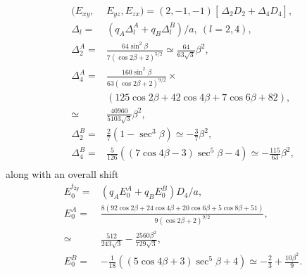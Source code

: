 \documentclass[a4paper,prb]{revtex4-1}  %
\newcommand{\rev}[1]{{\color{blue}{#1}}}
\begin{document}
\begin{align}
(E_{xy},&E_{yz},E_{zx})= (2, -1, -1)
\left[\frac{}{} \Delta_{2}  D_2 + \Delta_4 D_4\right],\\
\Delta_{l} =&  \left(q_A \Delta_{l}^A + q_B\Delta_{l}^B\right)/a,~(l=2,4),\\
\Delta_{2}^A =& 
\frac{64 \sin ^2\beta }{7 (\cos 2 \beta +2)^{5/2}} %
 \simeq \frac{64}{63 \sqrt{3}}\beta ^2,\\
\Delta_4^A =&
 \frac{160 \sin ^2\beta}{63 (\cos 2\beta+2)^{9/2}} \times \\
&  (125 \cos 2\beta+42 \cos 4\beta+7 \cos 6\beta+82),\\
\simeq& \frac{40960}{5103 \sqrt{3}}\beta ^2,\\
\Delta_{2}^B =& \frac{2}{7} \left(1-\sec ^3\beta\right)
\simeq -\frac{3}{7}\beta ^2,\\
  \Delta_4^B =&\frac{5}{126} \left((7 \cos 4\beta-3) \sec ^5\beta-4\right)
  \simeq -\frac{115}{63}\beta ^2,\\
 \end{align}
along with an overall shift
\rev{E0t2g or change in it? how to define the expressions... plotted is always change in it...}
\begin{align}
E_{0}^{t_{2g}} =& \left(q_A E_{0}^A + q_BE_{0}^B\right)D_4/a,\\
E_{0}^A =&
 \frac{8 (92 \cos 2\beta+24 \cos 4\beta+20 \cos 6\beta+5 \cos 8\beta+51)}{9 (\cos 2\beta+2)^{9/2}},\\
 \simeq& \frac{512}{243 \sqrt{3}}-\frac{2560 \beta ^2}{729 \sqrt{3}},\\
E_{0}^B=&
 -\frac{1}{18} \left((5 \cos 4\beta+3) \sec ^5\beta+4\right)
 \simeq -\frac{2}{3}+\frac{10 \beta ^2}{9}.
 \end{align}
\end{document}
